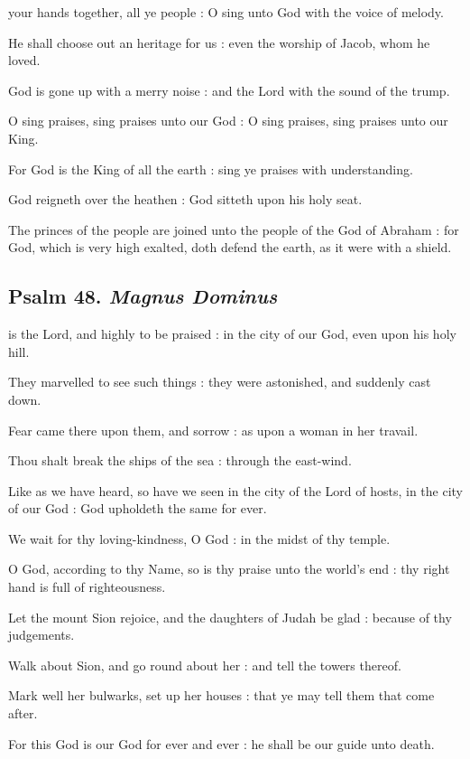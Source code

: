  your hands together, all ye people : O sing unto God with the voice of melody.\par
{}
He shall choose out an heritage for us : even the worship of Jacob, whom he loved.\par
{}God is gone up with a merry noise : and the Lord with the sound of the trump.\par
{}O sing praises, sing praises unto our God : O sing praises, sing praises unto our King.\par
{}For God is the King of all the earth : sing ye praises with understanding.\par
{}God reigneth over the heathen : God sitteth upon his holy seat.\par
{}The princes of the people are joined unto the people of the God of Abraham : for God, which is very high exalted, doth defend the earth, as it were with a shield.\par

\subsection{Psalm 48. \textit{Magnus Dominus}}

 is the Lord, and highly to be praised : in the city of our God, even upon his holy hill.\par
{}
They marvelled to see such things : they were astonished, and suddenly cast down.\par
{}Fear came there upon them, and sorrow : as upon a woman in her travail.\par
{}Thou shalt break the ships of the sea : through the east-wind.\par
{}Like as we have heard, so have we seen in the city of the Lord of hosts, in the city of our God : God upholdeth the same for ever.\par
{}We wait for thy loving-kindness, O God : in the midst of thy temple.\par
{}O God, according to thy Name, so is thy praise unto the world's end : thy right hand is full of righteousness.\par
{}Let the mount Sion rejoice, and the daughters of Judah be glad : because of thy judgements.\par
{}Walk about Sion, and go round about her : and tell the towers thereof.\par
{}Mark well her bulwarks, set up her houses : that ye may tell them that come after.\par
{}For this God is our God for ever and ever : he shall be our guide unto death.\par


